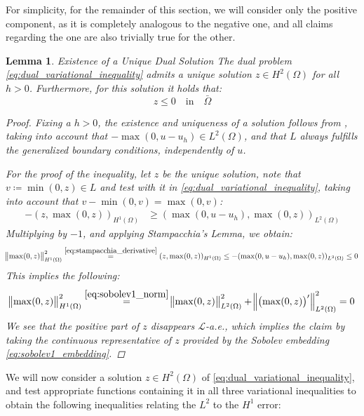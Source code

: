\documentclass[headsepline,footsepline,footinclude=false,oneside,fontsize=11pt,paper=a4,listof=totoc,bibliography=totoc]{scrbook} %
\newtheorem{lemma}{Lemma}
\begin{document}
For simplicity, for the remainder of this section, we will consider only the positive component, as it is completely analogous to the negative one, and all claims regarding the one are also trivially true for the other.

\begin{lemma}Existence of a Unique Dual Solution \newline 
	The dual problem \eqref{eq:dual_variational_inequality} admits a unique solution $z \in H^2(\Omega)$ for all $h > 0$. Furthermore, for this solution it holds that:
	\begin{equation} \label{eq:dual_solution_nonpositive}
	z \leq 0 \quad \text{in} \quad \bar{\Omega}
	\end{equation}
	\begin{proof}
		Fixing a $h>0$, the existence and uniqueness of a solution follows from , taking into account that $-\max(0,u-u_h) \in L^2(\Omega)$, and that $L$ always fulfills the generalized boundary conditions, independently of $u$.
		
		For the proof of the inequality, let $z$ be the unique solution, note that $v \coloneqq \min(0,z) \in L$ and test with it in \eqref{eq:dual_variational_inequality}, taking into account that $v - \min(0,v) = \max(0,v)$:
		\begin{align*}
			-(z,\max(0,z))_{H^1(\Omega)} &\geq (\max(0,u-u_h), \max(0,z))_{L^2(\Omega)} 
		\end{align*}
		Multiplying by $-1$, and applying Stampacchia's Lemma, we obtain:
		\begin{align*}
		\norm{\max(0,z)}_{H^1(\Omega)}^2 \overset{\eqref{eq:stampacchia_derivative}}{=} (z,\max(0,z))_{H^1(\Omega)} \leq - (\max(0,u-u_h), \max(0,z))_{L^2(\Omega)} \leq 0
		\end{align*}
		This implies the following:
		\begin{equation*}
		\norm{\max(0,z)}_{H^1(\Omega)}^2 \overset{\eqref{eq:sobolev1_norm}}{=}\norm{\max(0,z)}_{L^2(\Omega)}^2 + \norm{\left(\max(0,z)\right)'}_{L^2(\Omega)}^2 = 0
		\end{equation*}
		We see that the positive part of $z$ disappears $\mathcal{L}$-a.e., which implies the claim by taking the continuous representative of $z$ provided by the Sobolev embedding \eqref{eq:sobolev1_embedding}.
	\end{proof}
\end{lemma}


We will now consider a solution $z \in H^2(\Omega)$ of \eqref{eq:dual_variational_inequality}, and test appropriate functions containing it in all three variational inequalities to obtain the following inequalities relating the $L^2$ to the $H^1$ error:
\end{document}
